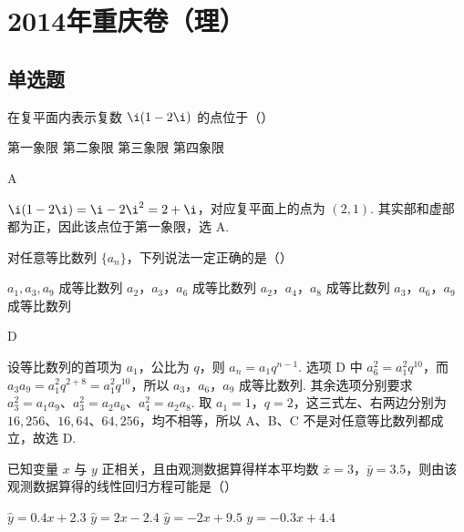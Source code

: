 \chapter{2014年重庆卷（理）}

\section{单选题}

\begin{problem}
在复平面内表示复数 \(\i(1 - 2\i)\) 的点位于（\quad）

\choices
    {第一象限}
    {第二象限}
    {第三象限}
    {第四象限}
\end{problem}

\begin{answer}
A
\end{answer}

\begin{solution}
\(\i(1-2\i)=\i-2\i^{2}=2+\i\)，对应复平面上的点为 \((2,1)\). 其实部和虚部都为正，因此该点位于第一象限，选 A.
\end{solution}

\begin{problem}
对任意等比数列 \(\{a_{n}\}\)，下列说法一定正确的是（\quad）

\choices
    {\(a_{1}, a_{3}, a_{9}\) 成等比数列}
    {\(a_{2}\)，\(a_{3}\)，\(a_{6}\) 成等比数列}
    {\(a_{2}\)，\(a_{4}\)，\(a_{8}\) 成等比数列}
    {\(a_{3}\)，\(a_{6}\)，\(a_{9}\) 成等比数列}
\end{problem}

\begin{answer}
D
\end{answer}

\begin{solution}
设等比数列的首项为 \(a_{1}\)，公比为 \(q\)，则 \(a_{n}=a_{1}q^{n-1}\). 选项 D 中
\(a_{6}^{2}=a_{1}^{2}q^{10}\)，而 \(a_{3}a_{9}=a_{1}^{2}q^{2+8}=a_{1}^{2}q^{10}\)，所以 \(a_{3}\)，\(a_{6}\)，\(a_{9}\) 成等比数列. 其余选项分别要求 \(a_{3}^{2}=a_{1}a_{9}\)、\(a_{3}^{2}=a_{2}a_{6}\)、\(a_{4}^{2}=a_{2}a_{8}\). 取 \(a_{1}=1\)，\(q=2\)，这三式左、右两边分别为 \(16,256\)、\(16,64\)、\(64,256\)，均不相等，所以 A、B、C 不是对任意等比数列都成立，故选 D.
\end{solution}

\begin{problem}
已知变量 \(x\) 与 \(y\) 正相关，且由观测数据算得样本平均数 \(\bar{x} = 3\)，\(\bar{y} = 3.5\)，则由该观测数据算得的线性回归方程可能是（\quad）

\choices
    {\(\hat{y} = 0.4x + 2.3\)}
    {\(\hat{y} = 2x - 2.4\)}
    {\(\hat{y} = -2x + 9.5\)}
    {\(\hat{y} = -0.3x + 4.4\)}
\end{problem}

